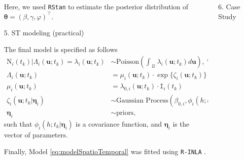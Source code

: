 \documentclass[12pt]{beamer}
\begin{document}
\begin{frame}[t]
\begin{columns}[t]
\begin{column}{0.24175\textwidth}
\begin{block}{}
			Here, we used \texttt{RStan} \citep{rstanpackage} to estimate the posterior distribution of $\boldsymbol{\theta} = (\beta, \gamma, \varphi)^{\top}$.
			
			\vspace{18pt}
			
			\textcolor{strong-blue}{\Large 5. ST modeling (practical)}\justifying\vspace{12pt}
			
			The final model is specified as follows
			{\footnotesize
			\begin{align} \label{eq:modelSpatioTemporal}
				\text{N}_i(t_k)|\Lambda_i(\mathbf{u}; t_k) = \lambda_i(\mathbf{u}; t_k) &\sim \text{Poisson}\left(\int_{\hspace{3pt}\mathcal{U}}\lambda_i(\mathbf{u}; t_k)d\mathbf{u}\right), ~\forall i, k \\
				\Lambda_i(\mathbf{u}; t_k) &= \mu_i(\mathbf{u}; t_k) \cdot \exp\{\zeta_i({\mathbf{u}; t_k})\} \nonumber \\
				\mu_i(\mathbf{u}; t_k) &= \lambda_{0, i}(\mathbf{u}; t_k) \cdot \texttt{I}_i(t_k) \nonumber \\ 
				\zeta_i(\mathbf{u}; t_k | \boldsymbol{\eta}_i) &\sim \text{Gaussian Process} (\beta_{0, i}, \phi_i(h; t_k | \boldsymbol{\eta}_i)) \nonumber \\
				\boldsymbol{\eta}_i &\sim \text{priors}, \nonumber
			\end{align}
			}%
			such that $\phi_i(h; t_k | \boldsymbol{\eta}_i)$ is a covariance function, and $\boldsymbol{\eta}_i$ is the vector of parameters.\vspace{6pt}
			
			Finally, Model \eqref{eq:modelSpatioTemporal}  was fitted using \texttt{R-INLA} \citep{rue2009approximate}. 
			
			\vspace{31pt}
			
			\end{block}

					
			\end{column}
		
			\begin{column}{0.24175\textwidth} \justifying %
								
				\begin{block}{}
				\textcolor{strong-blue}{\Large 6. Case Study}\justifying\vspace{12pt}
				

\end{block}
\end{column}
\end{columns}
\end{frame}
\end{document}
